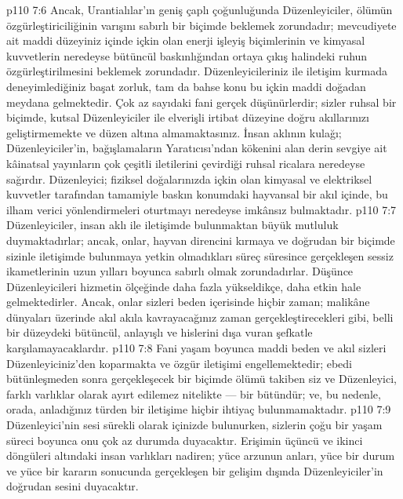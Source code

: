 \vs p110 7:6 Ancak, Urantialılar’ın geniş çaplı çoğunluğunda Düzenleyiciler, ölümün özgürleştiriciliğinin varışını sabırlı bir biçimde beklemek zorundadır; mevcudiyete ait maddi düzeyiniz içinde içkin olan enerji işleyiş biçimlerinin ve kimyasal kuvvetlerin neredeyse bütüncül baskınlığından ortaya çıkış halindeki ruhun özgürleştirilmesini beklemek zorundadır. Düzenleyicileriniz ile iletişim kurmada deneyimlediğiniz başat zorluk, tam da bahse konu bu içkin maddi doğadan meydana gelmektedir. Çok az sayıdaki fani gerçek düşünürlerdir; sizler ruhsal bir biçimde, kutsal Düzenleyiciler ile elverişli irtibat düzeyine doğru akıllarınızı geliştirmemekte ve düzen altına almamaktasınız. İnsan aklının kulağı; Düzenleyiciler’in, bağışlamaların Yaratıcısı’ndan kökenini alan derin sevgiye ait kâinatsal yayınların çok çeşitli iletilerini çevirdiği ruhsal ricalara neredeyse sağırdır. Düzenleyici; fiziksel doğalarınızda içkin olan kimyasal ve elektriksel kuvvetler tarafından tamamiyle baskın konumdaki hayvansal bir akıl içinde, bu ilham verici yönlendirmeleri oturtmayı neredeyse imkânsız bulmaktadır.
\vs p110 7:7 Düzenleyiciler, insan aklı ile iletişimde bulunmaktan büyük mutluluk duymaktadırlar; ancak, onlar, hayvan direncini kırmaya ve doğrudan bir biçimde sizinle iletişimde bulunmaya yetkin olmadıkları süreç süresince gerçekleşen sessiz ikametlerinin uzun yılları boyunca sabırlı olmak zorundadırlar. Düşünce Düzenleyicileri hizmetin ölçeğinde daha fazla yükseldikçe, daha etkin hale gelmektedirler. Ancak, onlar sizleri beden içerisinde hiçbir zaman; malikâne dünyaları üzerinde akıl akıla kavrayacağınız zaman gerçekleştirecekleri gibi, belli bir düzeydeki bütüncül, anlayışlı ve hislerini dışa vuran şefkatle karşılamayacaklardır.
\vs p110 7:8 Fani yaşam boyunca maddi beden ve akıl sizleri Düzenleyiciniz’den koparmakta ve özgür iletişimi engellemektedir; ebedi bütünleşmeden sonra gerçekleşecek bir biçimde ölümü takiben siz ve Düzenleyici, farklı varlıklar olarak ayırt edilemez nitelikte --- bir bütündür; ve, bu nedenle, orada, anladığınız türden bir iletişime hiçbir ihtiyaç bulunmamaktadır.
\vs p110 7:9 Düzenleyici’nin sesi sürekli olarak içinizde bulunurken, sizlerin çoğu bir yaşam süreci boyunca onu çok az durumda duyacaktır. Erişimin üçüncü ve ikinci döngüleri altındaki insan varlıkları nadiren; yüce arzunun anları, yüce bir durum ve yüce bir kararın sonucunda gerçekleşen bir gelişim dışında Düzenleyiciler’in doğrudan sesini duyacaktır.
